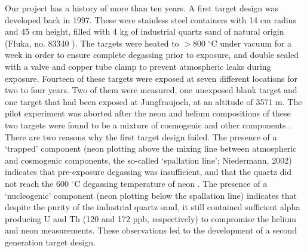 \documentclass{article}
\begin{document}
Our  project has  a history  of more  than ten  years. A  first target
design  was  developed  back  in  1997.  These  were  stainless  steel
containers with  14 cm radius  and 45 cm  height, filled with 4  kg of
industrial  quartz   sand  of   natural  origin  (Fluka,   no.   83340
\citep{schaefer2000, kober2004}).   The targets were  heated to $>$800
$^{\circ}$C  under vacuum  for  a  week in  order  to ensure  complete
degassing prior to exposure, and double sealed with a valve and copper
tube clamp to prevent  atmospheric leaks during exposure.  Fourteen of
these targets  were exposed  at seven different  locations for  two to
four years.  Two of them were measured, one unexposed blank target and
one target  that had been exposed  at Jungfraujoch, at  an altitude of
3571 m.   The pilot experiment was  aborted after the  neon and helium
compositions  of these  two  targets were  found  to be  a mixture  of
cosmogenic  and  other  components  \citep{kober2004}. There  are  two
reasons  why  the first  target  design  failed.   The presence  of  a
`trapped'  component  (neon plotting  above  the  mixing line  between
atmospheric  and  cosmogenic  components,  the  so-called  `spallation
line';  Niedermann, 2002)  indicates that  pre-exposure  degassing was
insufficient, and  that the quartz  did not reach the  600 $^{\circ}$C
degassing temperature of neon \citep{niedermann2002}.  The presence of
a `nucleogenic'  component (neon  plotting below the  spallation line)
indicates that  despite the purity  of the industrial quartz  sand, it
still contained sufficient alpha producing  U and Th (120 and 172 ppb,
respectively) to  compromise the helium and  neon measurements.  These
observations  led to  the development  of a  second  generation target
design.  \\
\end{document}
